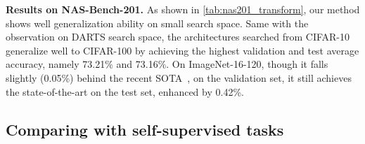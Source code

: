 \documentclass[10pt,twocolumn,letterpaper]{article}
\newcommand{\mypara}[1]{\vspace{1mm}\noindent\textbf{#1}}
\begin{document}
\mypara{Results on NAS-Bench-201.}
As shown in \cref{tab:nas201_transform}, our method shows well generalization ability on small search space.
Same with the observation on DARTS search space, the architectures searched from CIFAR-10 generalize well to CIFAR-100 by achieving the highest validation and test average accuracy, namely 73.21\% and 73.16\%.
On ImageNet-16-120, though it falls slightly (0.05\%) behind the recent SOTA~\cite{ye_2022_beta}, on the validation set, it still achieves the state-of-the-art on the test set, enhanced by 0.42\%.

\subsection{Comparing with self-supervised tasks}
\vspace{-4pt}
\begin{table*}
  \centering
  \caption{\textbf{Comparison results with classification-based self-supervised tasks.} 
  Cls. denotes performing the classification on CIFAR-10.
  Rot., Col., and Jig. denote performing the classification task with labels generated from Rotation~\cite{gidaris_2018_rotation}, Colorization~\cite{zhang_2016_col}, and solving the Jigsaw puzzles~\cite{noroozi_2016_jigsaw} tasks.
  All experiments are run 4 times independently on CIFAR-10 (C10) and CIFAR-100 (C100).
  }
  \vspace{-6pt}
  \small
\end{table*}
\end{document}

